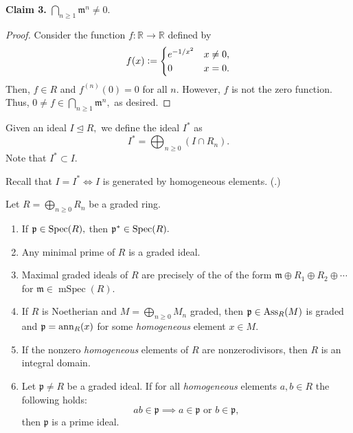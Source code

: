 \documentclass[12pt]{article}	%
\DeclareMathOperator{\mSpec}{mSpec}
\begin{document}
\begin{ex}
	\textbf{Claim 3.} $\bigcap_{n \ge 1}\mathfrak{m}^n \neq 0.$
	\begin{proof} 
		Consider the function $f : \mathbb{R} \to \mathbb{R}$ defined by
		\begin{equation*} 
			f(x) \vcentcolon= \begin{cases}
				e^{-1/x^2} & x \neq 0,\\
				0 & x = 0.
			\end{cases}
		\end{equation*}
		Then, $f \in R$ and $f^{(n)}(0) = 0$ for all $n.$ However, $f$ is not the zero function. Thus, $0 \neq f \in \bigcap_{n \ge 1}\mathfrak{m}^n,$ as desired.
	\end{proof}
\end{ex}

\begin{defn}%
	Given an ideal $I \unlhd R,$ we define the ideal $I^*$ as
	\begin{equation*} 
		I^* = \bigoplus_{n \ge 0} (I \cap R_n).
	\end{equation*}
	Note that $I^* \subset I.$
\end{defn}

Recall that $I = I^* \Leftrightarrow I$ is generated by homogeneous elements. (.)

\begin{prop}
	Let $R = \bigoplus_{n \ge 0}R_n$ be a graded ring.
	\begin{enumerate}
		\item If $\mathfrak{p} \in \operatorname{Spec}(R),$ then $\mathfrak{p}^* \in \operatorname{Spec}(R).$
		\item Any minimal prime of $R$ is a graded ideal.
		\item Maximal graded ideals of $R$ are precisely of the of the form $\mathfrak{m} \oplus R_1 \oplus R_2 \oplus \cdots$ for $\mathfrak{m} \in \mSpec(R).$
		\item If $R$ is Noetherian and $M = \bigoplus_{n \ge 0}M_n$ graded, then $\mathfrak{p} \in \operatorname{Ass}_R(M)$ is graded and $\mathfrak{p} = \operatorname{ann}_R(x)$ for some \emph{homogeneous} element $x \in M.$
		\item If the nonzero \emph{homogeneous} elements of $R$ are nonzerodivisors, then $R$ is an integral domain.
		\item Let $\mathfrak{p} \neq R$ be a graded ideal. If for all \emph{homogeneous} elements $a, b \in R$ the following holds:
		\begin{equation*} 
			ab \in \mathfrak{p} \implies a \in \mathfrak{p} \text{ or } b \in \mathfrak{p},
		\end{equation*}
		then $\mathfrak{p}$ is a prime ideal.
	\end{enumerate}
\end{prop}
\end{document}

